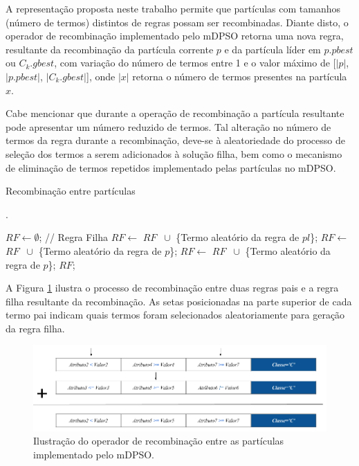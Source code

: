 \documentclass[
	12pt,				%
	openany,			%
	oneside,	
	a4paper,			%
	brazil,				%
	]{unimontes-ppgmsc-abntex2}
\begin{document}
A representação proposta neste trabalho permite que partículas com tamanhos (número de termos) distintos de regras possam ser recombinadas. Diante disto, o operador de recombinação implementado pelo mDPSO retorna uma nova regra, resultante da recombinação da partícula corrente $p$ e da partícula líder em $p.pbest$ ou $C_k.gbest$, com variação do número de termos entre 1 e o valor máximo de [$|p|$, $|p.pbest|$, $|C_k.gbest|$], onde $|x|$ retorna o número de termos presentes na partícula $x$. 

Cabe mencionar que durante a operação de recombinação a partícula resultante pode apresentar um número reduzido de termos. Tal alteração no número de termos da regra durante a recombinação, deve-se à aleatoriedade do processo de seleção dos termos a serem adicionados à solução filha, bem como o mecanismo de eliminação de termos repetidos implementado pelas partículas no mDPSO.

\begin{algorithm}[ht]
\caption{Recombinação entre partículas}.
\label{alg:recomb}
\begin{algorithmic}[1]
\State $RF \leftarrow \emptyset$; // Regra Filha
		\State $RF \leftarrow$ $RF$ $\ \cup$ \{Termo aleatório da regra de $pl$\};
	\Else
		\State $RF \leftarrow$ $RF$ $\ \cup$ \{Termo aleatório da regra de $p$\};
	\EndIf
\EndFor
{}
	\State $RF \leftarrow$ $RF$ $\ \cup$ \{Termo aleatório da regra de $p$\};
\EndFor
\State \Return $RF$;
\end{algorithmic}
\end{algorithm}

A Figura \ref{fig:recomb} ilustra o processo de recombinação entre duas regras pais e a regra filha resultante da recombinação. As setas posicionadas na parte superior de cada termo pai  indicam quais termos foram selecionados aleatoriamente para geração da regra filha.

\begin{figure}[ht]
\centering
\includegraphics[scale=.5]{img/recombinacao}
\caption{Ilustração do operador de recombinação entre as partículas implementado pelo mDPSO.}
\label{fig:recomb}
\end{figure}
\end{document}
